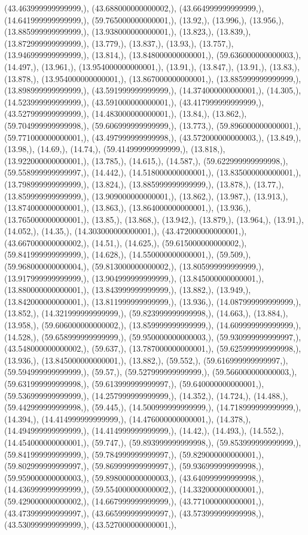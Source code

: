 \documentclass{article}
\begin{document}
(43.463999999999999,), (43.688000000000002,), (43.664999999999999,), (14.641999999999999,), (59.765000000000001,), (13.92,), (13.996,), (13.956,), (13.885999999999999,), (13.938000000000001,), (13.823,), (13.839,), (13.872999999999999,), (13.779,), (13.837,), (13.93,), (13.757,), (13.946999999999999,), (13.814,), (13.848000000000001,), (59.636000000000003,), (14.497,), (13.961,), (13.954000000000001,), (13.91,), (13.847,), (13.91,), (13.83,), (13.878,), (13.954000000000001,), (13.867000000000001,), (13.885999999999999,), (13.898999999999999,), (43.591999999999999,), (14.374000000000001,), (14.305,), (14.523999999999999,), (43.591000000000001,), (43.417999999999999,), (43.527999999999999,), (14.483000000000001,), (13.84,), (13.862,), (59.704999999999998,), (59.606999999999999,), (13.773,), (59.896000000000001,), (59.771000000000001,), (43.497999999999998,), (43.572000000000003,), (13.849,), (13.98,), (14.69,), (14.74,), (59.414999999999999,), (13.818,), (13.922000000000001,), (13.785,), (14.615,), (14.587,), (59.622999999999998,), (59.558999999999997,), (14.442,), (14.518000000000001,), (13.835000000000001,), (13.798999999999999,), (13.824,), (13.885999999999999,), (13.878,), (13.77,), (13.859999999999999,), (13.909000000000001,), (13.862,), (13.987,), (13.913,), (13.874000000000001,), (13.863,), (13.864000000000001,), (13.936,), (13.765000000000001,), (13.85,), (13.868,), (13.942,), (13.879,), (13.964,), (13.91,), (14.052,), (14.35,), (14.303000000000001,), (43.472000000000001,), (43.667000000000002,), (14.51,), (14.625,), (59.615000000000002,), (59.841999999999999,), (14.628,), (14.550000000000001,), (59.509,), (59.968000000000004,), (59.813000000000002,), (13.805999999999999,), (13.917999999999999,), (13.904999999999999,), (13.845000000000001,), (13.880000000000001,), (13.843999999999999,), (13.882,), (13.949,), (13.842000000000001,), (13.811999999999999,), (13.936,), (14.087999999999999,), (13.852,), (14.321999999999999,), (59.823999999999998,), (14.663,), (13.884,), (13.958,), (59.606000000000002,), (13.859999999999999,), (14.609999999999999,), (14.528,), (59.658999999999999,), (59.950000000000003,), (59.930999999999997,), (43.548000000000002,), (59.637,), (13.787000000000001,), (59.625999999999998,), (13.936,), (13.845000000000001,), (13.882,), (59.552,), (59.616999999999997,), (59.594999999999999,), (59.57,), (59.527999999999999,), (59.566000000000003,), (59.631999999999998,), (59.613999999999997,), (59.640000000000001,), (59.536999999999999,), (14.257999999999999,), (14.352,), (14.724,), (14.488,), (59.442999999999998,), (59.445,), (14.500999999999999,), (14.718999999999999,), (14.394,), (14.414999999999999,), (14.476000000000001,), (14.378,), (14.494999999999999,), (14.414999999999999,), (14.42,), (14.493,), (14.552,), (14.454000000000001,), (59.747,), (59.893999999999998,), (59.853999999999999,), (59.841999999999999,), (59.784999999999997,), (59.829000000000001,), (59.802999999999997,), (59.869999999999997,), (59.936999999999998,), (59.959000000000003,), (59.898000000000003,), (43.640999999999998,), (14.436999999999999,), (59.554000000000002,), (14.332000000000001,), (59.429000000000002,), (14.667999999999999,), (43.771000000000001,), (43.473999999999997,), (43.665999999999997,), (43.573999999999998,), (43.530999999999999,), (43.527000000000001,), 
\end{document}
